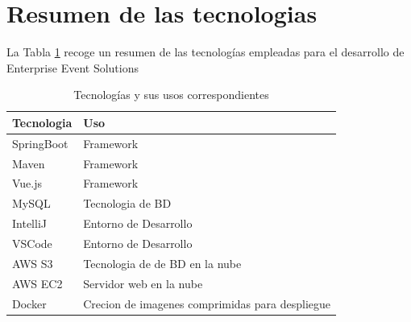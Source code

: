 \section{Resumen de las tecnologias}
La Tabla \ref{tabla:tecnologias_usos} recoge un resumen de las tecnologías empleadas para el desarrollo de Enterprise Event Solutions
\begin{table}[h]
\begin{tabular}{ p{3cm} l  }

    \hline
    Tecnologia& Uso \\
    \hline
    SpringBoot   & Framework \\
    Maven &   Framework \\
    Vue.js & Framework  \\
    MySQL    & Tecnologia de BD \\
    IntelliJ&   Entorno de Desarrollo  \\
    VSCode& Entorno de Desarrollo \\
    AWS S3& Tecnologia de de BD en la nube  \\
    AWS EC2& Servidor web en la nube  \\
    Docker& Crecion de imagenes comprimidas para despliegue  \\
    \hline
   \end{tabular}
   \caption{Tecnologías y sus usos correspondientes}
   \label{tabla:tecnologias_usos}
\end{table}